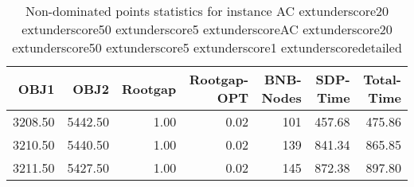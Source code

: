 \begin{table}
\caption{Non-dominated points statistics for instance AC	extunderscore20	extunderscore50	extunderscore5	extunderscoreAC	extunderscore20	extunderscore50	extunderscore5	extunderscore1	extunderscoredetailed}
\label{tab:stats/AC_20_50_5_AC_20_50_5_1_detailed}
\begin{tabular}{rrrrrrr}
\toprule
OBJ1 & OBJ2 & Rootgap & Rootgap-OPT & BNB-Nodes & SDP-Time & Total-Time \\
\midrule
3208.50 & 5442.50 & 1.00 & 0.02 & 101 & 457.68 & 475.86 \\
3210.50 & 5440.50 & 1.00 & 0.02 & 139 & 841.34 & 865.85 \\
3211.50 & 5427.50 & 1.00 & 0.02 & 145 & 872.38 & 897.80 \\
\bottomrule
\end{tabular}
\end{table}
